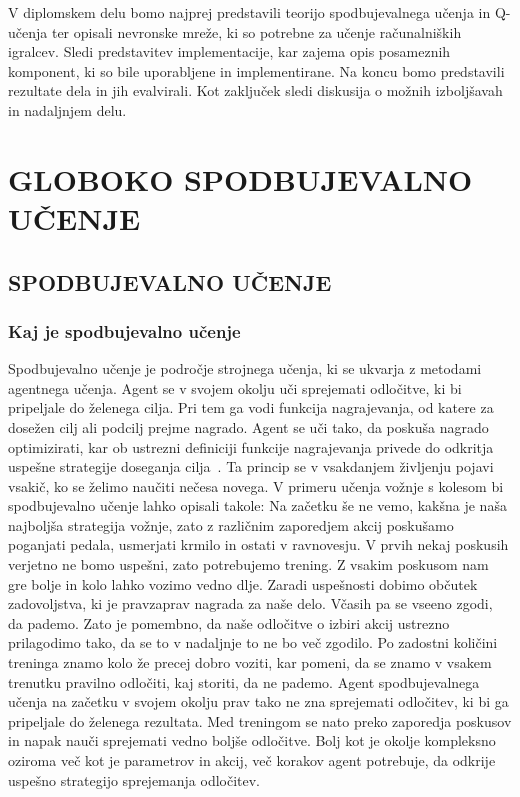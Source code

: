 \documentclass[cover]{thesis}
\begin{document}
V diplomskem delu bomo najprej predstavili teorijo spodbujevalnega učenja in Q-učenja ter opisali nevronske mreže, ki so potrebne za učenje računalniških igralcev. Sledi predstavitev implementacije, kar zajema opis posameznih komponent, ki so bile uporabljene in implementirane. Na koncu bomo predstavili rezultate dela in jih evalvirali. Kot zaključek sledi diskusija o možnih izboljšavah in nadaljnjem delu.

\chapter{GLOBOKO SPODBUJEVALNO UČENJE}
\section{SPODBUJEVALNO UČENJE}
\subsection{Kaj je spodbujevalno učenje}

Spodbujevalno učenje je področje strojnega učenja, ki se ukvarja z metodami agentnega učenja. Agent se v svojem okolju uči sprejemati odločitve, ki bi pripeljale do želenega cilja. Pri tem ga vodi funkcija nagrajevanja, od katere za dosežen cilj ali podcilj prejme nagrado. Agent se uči tako, da poskuša nagrado optimizirati, kar ob ustrezni definiciji funkcije nagrajevanja privede do odkritja uspešne strategije doseganja cilja~\cite{sutton2018reinforcement}. Ta princip se v vsakdanjem življenju pojavi vsakič, ko se želimo naučiti nečesa novega. V primeru učenja vožnje s kolesom bi spodbujevalno učenje lahko opisali takole: Na začetku še ne vemo, kakšna je naša najboljša strategija vožnje, zato z različnim zaporedjem akcij poskušamo poganjati pedala, usmerjati krmilo in ostati v ravnovesju. V prvih nekaj poskusih verjetno ne bomo uspešni, zato potrebujemo trening. Z vsakim poskusom nam gre bolje in kolo lahko vozimo vedno dlje. Zaradi uspešnosti dobimo občutek zadovoljstva, ki je pravzaprav nagrada za naše delo. Včasih pa se vseeno zgodi, da pademo. Zato je pomembno, da naše odločitve o izbiri akcij ustrezno prilagodimo tako, da se to v nadaljnje to ne bo več zgodilo. Po zadostni količini treninga znamo kolo že precej dobro voziti, kar pomeni, da se znamo v vsakem trenutku pravilno odločiti, kaj storiti, da ne pademo. Agent spodbujevalnega učenja na začetku v svojem okolju prav tako ne zna sprejemati odločitev, ki bi ga pripeljale do želenega rezultata. Med treningom se nato preko zaporedja poskusov in napak nauči sprejemati vedno boljše odločitve. Bolj kot je okolje kompleksno oziroma več kot je parametrov in akcij, več korakov agent potrebuje, da odkrije uspešno strategijo sprejemanja odločitev.
\end{document}

